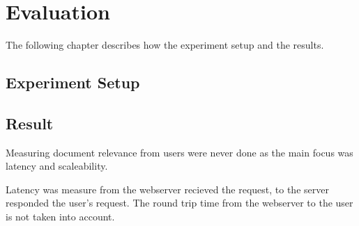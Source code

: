 \chapter{Evaluation}
\label{ch:evaluation}
The following chapter describes how the experiment setup and the results.

\section{Experiment Setup}


\section{Result}
Measuring document relevance from users were never done as the main focus was latency and scaleability.

Latency was measure from the webserver recieved the request, to the server responded the user's request.
The round trip time from the webserver to the user is not taken into account.
